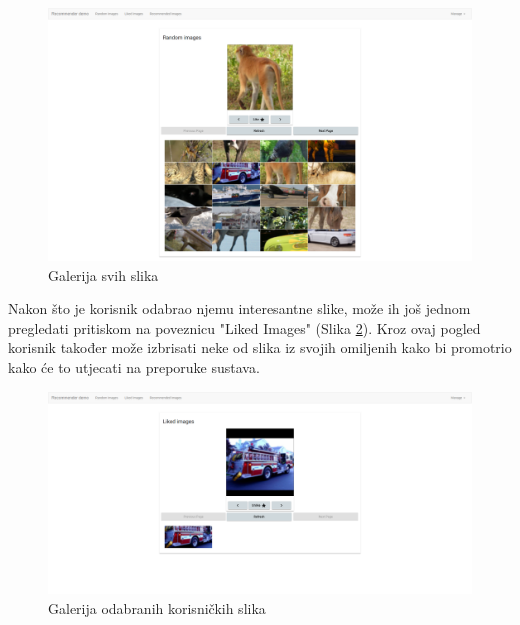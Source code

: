 \documentclass[times, utf8, proizvoljni, numeric]{fer}
\begin{document}
\begin{figure}[!ht]
	\begin{center}
		\captionsetup{justification=centering}
		\includegraphics[width=1.0\textwidth]{./imgs/demo-preporucitelja-po-sadrzaju/tijek-rada/demo-rand.png}
		\caption{Galerija svih slika}
		\label{fg:demo_rand}
	\end{center}
\end{figure}


Nakon što je korisnik odabrao njemu interesantne slike, može ih još jednom pregledati pritiskom na poveznicu "Liked Images" (Slika \ref{fg:demo_liked}). Kroz ovaj pogled korisnik također može izbrisati neke od slika iz svojih omiljenih kako bi promotrio kako će to utjecati na preporuke sustava.

\begin{figure}[H]
	\begin{center}
		\captionsetup{justification=centering}
		\includegraphics[width=1.0\textwidth]{./imgs/demo-preporucitelja-po-sadrzaju/tijek-rada/demo-liked.png}
		\caption{Galerija odabranih korisničkih slika}
		\label{fg:demo_liked}
	\end{center}
\end{figure}
\end{document}
